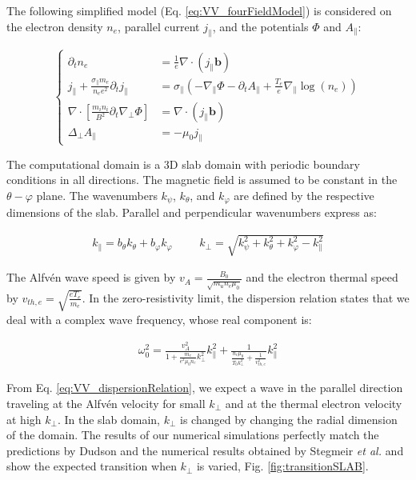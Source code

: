 The following simplified model (Eq. \ref{eq:VV_fourFieldModel}) is considered on the electron density $n_e$, parallel current $j_\parallel$, and the potentials $\Phi$ and $A_\parallel$: \newline

\begin{equation}
	\left\{
	\begin{aligned}
		\partial_t n_e &= \frac{1}{e}\nabla \cdot (j_\parallel \mathbf{b}) \\
		j_\parallel + \frac{\sigma_\parallel m_e}{n_e e^2} \partial_t j_\parallel  &= \sigma_\parallel \left( -\nabla_\parallel \Phi - \partial_t A_\parallel + \frac{T_e}{e} \nabla_\parallel \log(n_e) \right) \\
		\nabla \cdot \left[ \frac{m_i n_i}{B^2} \partial_t \nabla_\perp \Phi \right] &= \nabla \cdot (j_\parallel \mathbf{b}) \\
		\Delta_\perp A_\parallel &= -\mu_0 j_\parallel 
	\end{aligned}
	\right.
	\label{eq:VV_fourFieldModel}
\end{equation}

The computational domain is a 3D slab domain with periodic boundary conditions in all directions. The magnetic field is assumed to be constant in the $\theta-\varphi$ plane. The wavenumbers $k_\psi$, $k_\theta$, and $k_\varphi$ are defined by the respective dimensions of the slab. Parallel and perpendicular wavenumbers express as: \newline

\begin{align}
	k_\parallel = b_\theta k_\theta + b_\varphi k_\varphi &&& k_\perp = \sqrt{k_\psi^2 + k_\theta^2 + k_\varphi^2 - k_\parallel^2}
\end{align}

The Alfvén wave speed is given by $v_A = \frac{B_0}{\sqrt{m_u n_e \mu_0}}$ and the electron thermal speed by $v_{th,e} = \sqrt{\frac{e T_e}{m_e}}$. In the zero-resistivity limit, the dispersion relation states that we deal with a complex wave frequency, whose real component is: \newline

\begin{align}
	\label{eq:VV_dispersionRelation}
	\omega_0^2 = \frac{v_A^2}{1 + \frac{m_e}{e^2 \mu_0 n_e} k_\perp^2} k_\parallel^2 + \frac{1}{\frac{n_e \mu_0}{T_0 k_\perp^2} + \frac{1}{v_{th,e}^2}} k_\parallel^2  
\end{align}

From Eq. \ref{eq:VV_dispersionRelation}, we expect a wave in the parallel direction traveling at the Alfvén velocity for small $k_\perp$ and at the thermal electron velocity at high $k_\perp$. In the slab domain, $k_\perp$ is changed by changing the radial dimension of the domain. The results of our numerical simulations perfectly match the predictions by Dudson \cite{Dudson2021} and the numerical results obtained by Stegmeir \emph{et al.} \cite{stegmeir2019} and show the expected transition when $k_\perp$ is varied, Fig. \ref{fig:transitionSLAB}. \newline

